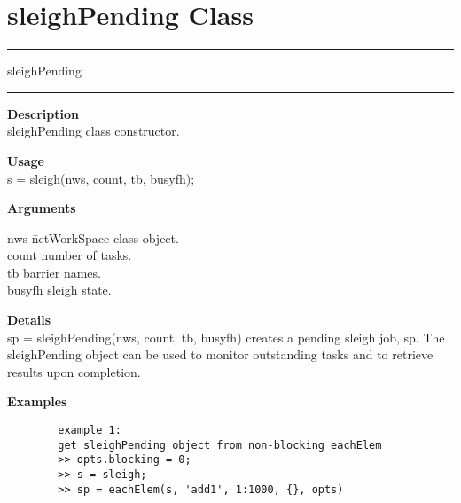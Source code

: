 \section {sleighPending Class}
\rule[0.06in]{6in}{0.01in}
\newline
sleighPending
\newline
\rule{6in}{0.01in}
\begin{list}{}{}
	\item {\bf Description}\\
	  sleighPending class constructor.  
	\item {\bf Usage}\\
	  s = sleigh(nws, count, tb, busyfh);
	\item {\bf Arguments}
		\begin{tabbing}
		nws \hspace{2.0cm} \= netWorkSpace class object.\\
		count \> number of tasks.\\
		tb \> barrier names.\\
		busyfh \> sleigh state.\\	
		\end{tabbing}
	\item {\bf Details}\\
     sp = sleighPending(nws, count, tb, busyfh) creates a pending sleigh job, sp. 
     The sleighPending object can be used to monitor outstanding tasks and to 
     retrieve results upon completion. 
         	    
	\item {\bf Examples}
		\begin{verbatim}
		example 1:  
		get sleighPending object from non-blocking eachElem
		>> opts.blocking = 0;
		>> s = sleigh;
		>> sp = eachElem(s, 'add1', 1:1000, {}, opts)
		\end{verbatim}
\end{list}


